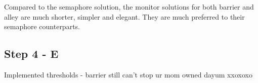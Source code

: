 Compared to the semaphore solution, the monitor solutions for both barrier and alley are much shorter, simpler and elegant. They are much preferred to their semaphore counterparts.

\subsection*{Step 4 - E}

Implemented thresholds - barrier still can't stop ur mom owned dayum xxoxoxo

